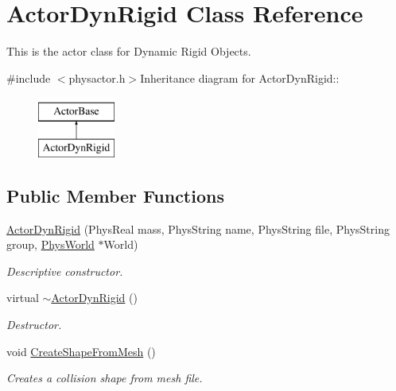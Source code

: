 \hypertarget{classActorDynRigid}{
\section{ActorDynRigid Class Reference}
\label{d4/d0e/classActorDynRigid}
}


This is the actor class for Dynamic Rigid Objects.  


{\ttfamily \#include $<$physactor.h$>$}Inheritance diagram for ActorDynRigid::\begin{figure}[H]
\begin{center}
\leavevmode
\includegraphics[height=2cm]{d4/d0e/classActorDynRigid}
\end{center}
\end{figure}
\subsection*{Public Member Functions}
\begin{DoxyCompactItemize}
\item 
\hyperlink{classActorDynRigid_a1402924eddf33a4789e3c3f68bbf6c98}{ActorDynRigid} (PhysReal mass, PhysString name, PhysString file, PhysString group, \hyperlink{classPhysWorld}{PhysWorld} $\ast$World)
\begin{DoxyCompactList}\small\item\em Descriptive constructor. \item\end{DoxyCompactList}\item 
virtual \hyperlink{classActorDynRigid_a3a5504a2ce11f1e95d29a6e431c0c2aa}{$\sim$ActorDynRigid} ()
\begin{DoxyCompactList}\small\item\em Destructor. \item\end{DoxyCompactList}\item 
void \hyperlink{classActorDynRigid_adbfe8a19f8aafe7928d9896c37821059}{CreateShapeFromMesh} ()
\begin{DoxyCompactList}\small\item\em Creates a collision shape from mesh file. \item\end{DoxyCompactList}\end{DoxyCompactItemize}
